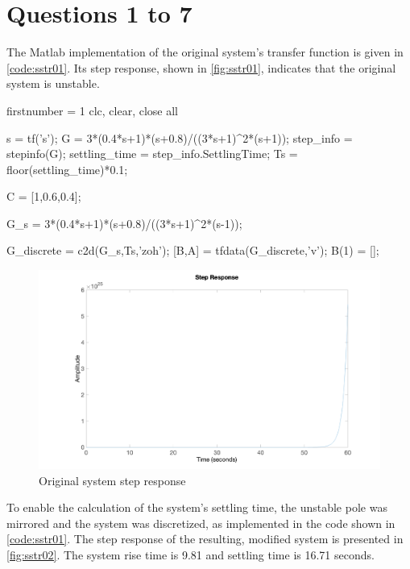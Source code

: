 \FloatBarrier
\section{Questions 1 to 7}
The Matlab implementation of the original system's transfer function is given in \autoref{code:sstr01}. Its step response, shown in \autoref{fig:sstr01}, indicates that the original system is unstable.

\begin{code}
	\begin{matlabcode}{firstnumber = 1}
clc, clear, close all

s = tf('s');
G = 3*(0.4*s+1)*(s+0.8)/((3*s+1)^2*(s+1));
step_info = stepinfo(G);
settling_time = step_info.SettlingTime;
Ts = floor(settling_time)*0.1;

C = [1,0.6,0.4];

G_s = 3*(0.4*s+1)*(s+0.8)/((3*s+1)^2*(s-1));

G_discrete = c2d(G_s,Ts,'zoh');
[B,A] = tfdata(G_discrete,'v');
B(1) = [];
	\end{matlabcode}
	\label{code:sstr01}
\end{code}

\begin{figure}
	\centering
	\includegraphics[width=\textwidth]{images/sstr01.png}
	\caption{Original system step response}
	\label{fig:sstr01}
\end{figure}

To enable the calculation of the system's settling time, the unstable pole was mirrored and the system was discretized, as implemented in the code shown in \autoref{code:sstr01}. The step response of the resulting, modified system is presented in \autoref{fig:sstr02}. The system rise time is 9.81 and settling time is 16.71 seconds. 

